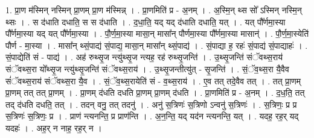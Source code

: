 \documentclass[17pt]{extarticle}
\begin{document}
1. प्रा॒ण म॑स्मिन् नस्मिन् प्रा॒णम् प्रा॒ण म॑स्मिन्न् । . प्रा॒णमिति॑ प्र - अ॒नम् । . अ॒स्मि॒न् थ्स सो᳚ ऽस्मिन् नस्मि॒न् थ्सः । . स द॑धाति दधाति॒ स स द॑धाति । . द॒धा॒ति॒ यद् यद् द॑धाति दधाति॒ यत् । . यत् पौ᳚र्णमा॒स्या पौ᳚र्णमा॒स्या यद् यत् पौ᳚र्णमा॒स्या । . पौ॒र्ण॒मा॒स्या मासा॒न् मासा᳚न् पौर्णमा॒स्या पौ᳚र्णमा॒स्या मासान्॑ । . पौ॒र्ण॒मा॒स्येति॑ पौर्ण - मा॒स्या । . मासा᳚न् थ्सं॒पाद्य॑ सं॒पाद्य॒ मासा॒न् मासा᳚न् थ्सं॒पाद्य॑ । . सं॒पाद्या ह॒ रहः॑ सं॒पाद्य॑ सं॒पाद्याहः॑ । . सं॒पाद्येति॑ सं - पाद्य॑ । . अह॑ रुथ्सृ॒ज न्त्यु॑थ्सृ॒ज न्त्यह॒ रह॑ रुथ्सृ॒जन्ति॑ । . उ॒थ्सृ॒जन्ति॑ संॅवथ्स॒राय॑ संॅवथ्स॒रा यो᳚थ्सृ॒ज न्त्यु॑थ्सृ॒जन्ति॑ संॅवथ्स॒राय॑ । . उ॒थ्सृ॒जन्तीत्यु॑त् - सृ॒जन्ति॑ । . सं॒ॅव॒थ्स॒रा यै॒वैव सं॑ॅवथ्स॒राय॑ संॅवथ्स॒रा यै॒व । . सं॒ॅव॒थ्स॒रायेति॑ सं - व॒थ्स॒राय॑ । . ए॒व तत् तदे॒वैव तत् । . तत् प्रा॒णम् प्रा॒णम् तत् तत् प्रा॒णम् । . प्रा॒णम् द॑धति दधति प्रा॒णम् प्रा॒णम् द॑धति । . प्रा॒णमिति॑ प्र - अ॒नम् । . द॒ध॒ति॒ तत् तद् द॑धति दधति॒ तत् । . तदन् वनु॒ तत् तदनु॑ । . अनु॑ स॒त्रिणः॑ स॒त्रिणो ऽन्वनु॑ स॒त्रिणः॑ । . स॒त्रिणः॒ प्र प्र स॒त्रिणः॑ स॒त्रिणः॒ प्र । . प्राण॑ न्त्यनन्ति॒ प्र प्राण॑न्ति । . अ॒न॒न्ति॒ यद् यद॑न न्त्यनन्ति॒ यत् । . यदह॒ रह॒र् यद् यदहः॑ । . अह॒र् न नाह॒ रह॒र् न । \newline
\end{document}

